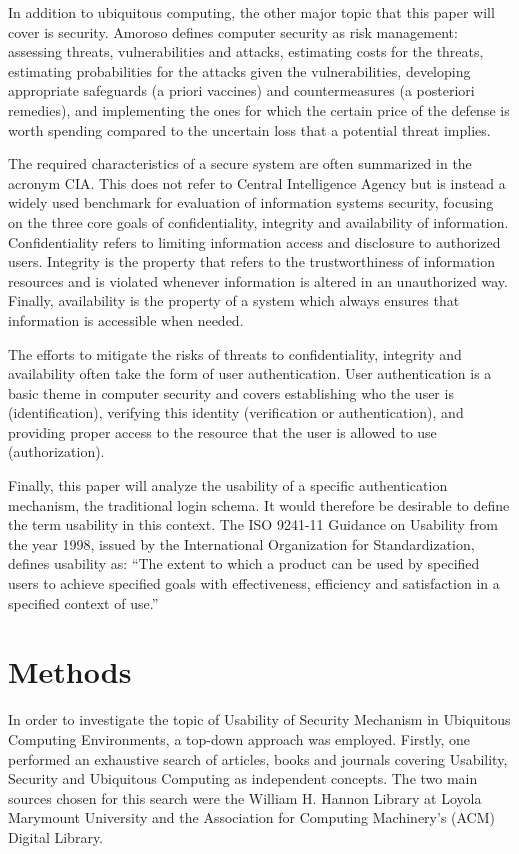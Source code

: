 \documentclass{article}
\begin{document}
In addition to ubiquitous computing, the other major topic that this paper will cover is security. Amoroso defines computer security as risk management: assessing threats, vulnerabilities and attacks, estimating costs for the threats, estimating probabilities for the attacks given the vulnerabilities, developing appropriate safeguards (a priori vaccines) and countermeasures (a posteriori remedies), and implementing the ones for which the certain price of the defense is worth spending compared to the uncertain loss that a potential threat implies. 

The required characteristics of a secure system are often summarized in the acronym CIA. This does not refer to Central Intelligence Agency but is instead a widely used benchmark for evaluation of information systems security, focusing on the three core goals of confidentiality, integrity and availability of information. Confidentiality refers to limiting information access and disclosure to authorized users. Integrity is the property that refers to the trustworthiness of information resources and is violated whenever information is altered in an unauthorized way. Finally, availability is the property of a system which always ensures that information is accessible when needed. 

The efforts to mitigate the risks of threats to confidentiality, integrity and availability often take the form of user authentication. User authentication is a basic theme in computer security and covers establishing who the user is (identification), verifying this identity (verification or authentication), and providing proper access to the resource that the user is allowed to use (authorization). 

Finally, this paper will analyze the usability of a specific authentication mechanism, the traditional login schema. It would therefore be desirable to define the term usability in this context. The ISO 9241-11 Guidance on Usability from the year 1998, issued by the International Organization for Standardization, defines usability as: “The extent to which a product can be used by specified users to achieve specified goals with effectiveness, efficiency and satisfaction in a specified context of use.”

\section{Methods}
In order to investigate the topic of Usability of Security Mechanism in Ubiquitous Computing Environments, a top-down approach was employed. Firstly, one performed an exhaustive search of articles, books and journals covering Usability, Security and Ubiquitous Computing as independent concepts. The two main sources chosen for this search were the William H. Hannon Library at Loyola Marymount University and the Association for Computing Machinery’s (ACM) Digital Library.  
\end{document}
